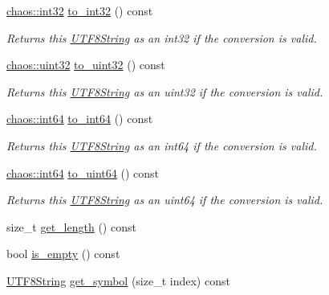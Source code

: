 \begin{DoxyCompactItemize}
\hyperlink{namespacechaos_ad1de7efb430365afd2c9446a0f522a90}{chaos\-::int32} \hyperlink{classchaos_1_1str_1_1_u_t_f8_string_a17309b0f4d25be1b83a188883c4a9861}{to\-\_\-int32} () const 
\begin{DoxyCompactList}\small\item\em Returns this \hyperlink{classchaos_1_1str_1_1_u_t_f8_string}{U\-T\-F8\-String} as an int32 if the conversion is valid. \end{DoxyCompactList}\item 
\hyperlink{namespacechaos_a3b3a47ba1e284655bf1a30c441121c60}{chaos\-::uint32} \hyperlink{classchaos_1_1str_1_1_u_t_f8_string_a85ec2ebfdb419a3422cf87497cabdd86}{to\-\_\-uint32} () const 
\begin{DoxyCompactList}\small\item\em Returns this \hyperlink{classchaos_1_1str_1_1_u_t_f8_string}{U\-T\-F8\-String} as an uint32 if the conversion is valid. \end{DoxyCompactList}\item 
\hyperlink{namespacechaos_a46c61f58d99879b936f58234b9a05e0c}{chaos\-::int64} \hyperlink{classchaos_1_1str_1_1_u_t_f8_string_a18eee1b350d45995e43ef41cfd8bb92a}{to\-\_\-int64} () const 
\begin{DoxyCompactList}\small\item\em Returns this \hyperlink{classchaos_1_1str_1_1_u_t_f8_string}{U\-T\-F8\-String} as an int64 if the conversion is valid. \end{DoxyCompactList}\item 
\hyperlink{namespacechaos_a46c61f58d99879b936f58234b9a05e0c}{chaos\-::int64} \hyperlink{classchaos_1_1str_1_1_u_t_f8_string_a5ef3a02131444e2a90b634dad7edb19e}{to\-\_\-uint64} () const 
\begin{DoxyCompactList}\small\item\em Returns this \hyperlink{classchaos_1_1str_1_1_u_t_f8_string}{U\-T\-F8\-String} as an uint64 if the conversion is valid. \end{DoxyCompactList}\item 
size\-\_\-t \hyperlink{classchaos_1_1str_1_1_u_t_f8_string_ac0c724e649182e02462b48b94d1f5bf7}{get\-\_\-length} () const 
\item 
bool \hyperlink{classchaos_1_1str_1_1_u_t_f8_string_a4fc296e90fbbc45a1e3f142dcd1e9853}{is\-\_\-empty} () const 
\item 
\hyperlink{classchaos_1_1str_1_1_u_t_f8_string}{U\-T\-F8\-String} \hyperlink{classchaos_1_1str_1_1_u_t_f8_string_a04dbe9f15dc1b09c858e2450de26d40a}{get\-\_\-symbol} (size\-\_\-t index) const 

\end{DoxyCompactItemize}
